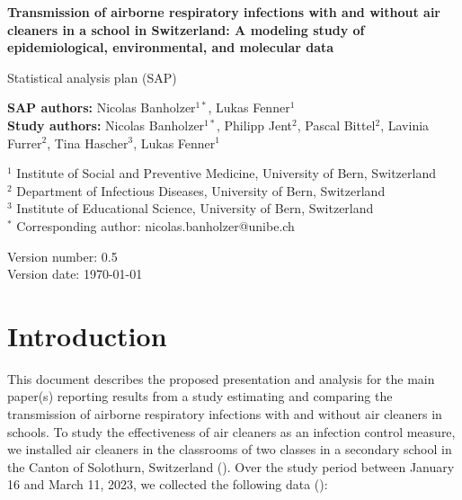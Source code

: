 \documentclass{article}
\begin{document}
\begin{titlepage}
        \vspace*{1cm}
            
        \LARGE
        \textbf{Transmission of airborne respiratory infections with and without air cleaners in a school in Switzerland: A modeling study of epidemiological, environmental, and molecular data}
            
        \vspace{0.5cm}
        \Large
        Statistical analysis plan (SAP)
            
        \vspace{1.5cm}
            
        \textbf{SAP authors:} Nicolas Banholzer$^{1*}$, Lukas Fenner$^1$ \\
        \textbf{Study authors:} Nicolas Banholzer$^{1*}$, Philipp Jent$^{2}$, Pascal Bittel$^{2}$, Lavinia Furrer$^{2}$, Tina Hascher$^{3}$, Lukas Fenner$^1$

        \vspace{1cm}

        $^1$ Institute of Social and Preventive Medicine, University of Bern, Switzerland \\
        $^2$ Department of Infectious Diseases, University of Bern, Switzerland \\
        $^3$ Institute of Educational Science, University of Bern, Switzerland \\
        $^*$ Corresponding author: nicolas.banholzer@unibe.ch
            
        \vfill
            
        \Large
        Version number: 0.5 \\
        Version date: \today 

        \vspace*{1cm}
\end{titlepage}

\tableofcontents

\clearpage

\section{Introduction}

This document describes the proposed presentation and analysis for the main paper(s) reporting results from a study estimating and comparing the transmission of airborne respiratory infections with and without air cleaners in schools. To study the effectiveness of air cleaners as an infection control measure, we installed air cleaners in the classrooms of two classes in a secondary school in the Canton of Solothurn, Switzerland (). Over the study period between January 16 and March 11, 2023, we collected the following data ():
\end{document}
